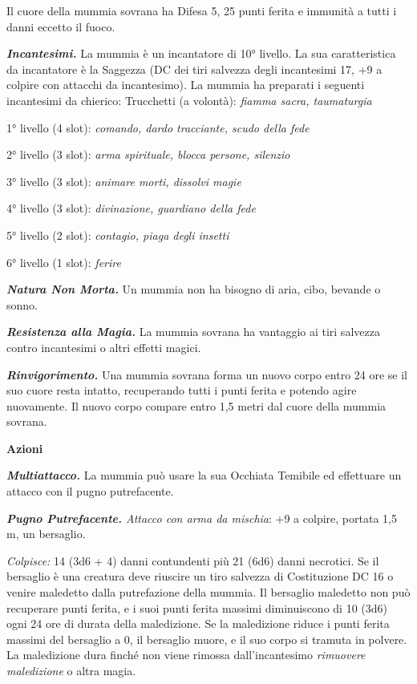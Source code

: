 \begin{multicols}{2}
Il cuore della mummia sovrana ha Difesa 5, 25 punti ferita e immunità a
tutti i danni eccetto il fuoco.

\emph{\textbf{Incantesimi.}} La mummia è un incantatore di 10° livello.
La sua caratteristica da incantatore è la Saggezza (DC dei tiri salvezza
degli incantesimi 17, +9 a colpire con attacchi da incantesimo). La
mummia ha preparati i seguenti incantesimi da chierico: Trucchetti (a
volontà): \emph{fiamma sacra, taumaturgia}

1° livello (4 slot): \emph{comando, dardo tracciante, scudo della fede}

2° livello (3 slot): \emph{arma spirituale, blocca persone, silenzio}

3° livello (3 slot): \emph{animare morti, dissolvi magie}

4° livello (3 slot): \emph{divinazione, guardiano della fede}

5° livello (2 slot): \emph{contagio, piaga degli insetti}

6° livello (1 slot): \emph{ferire}

\emph{\textbf{Natura Non Morta.}} Un mummia non ha bisogno di aria,
cibo, bevande o sonno.

\emph{\textbf{Resistenza alla Magia.}} La mummia sovrana ha vantaggio ai
tiri salvezza contro incantesimi o altri effetti magici.

\emph{\textbf{Rinvigorimento.}} Una mummia sovrana forma un nuovo corpo
entro 24 ore se il suo cuore resta intatto, recuperando tutti i punti
ferita e potendo agire nuovamente. Il nuovo corpo compare entro 1,5
metri dal cuore della mummia sovrana.

\textbf{Azioni}

\emph{\textbf{Multiattacco.}} La mummia può usare la sua Occhiata
Temibile ed effettuare un attacco con il pugno putrefacente.

\emph{\textbf{Pugno Putrefacente.} Attacco con arma da mischia}: +9 a
colpire, portata 1,5 m, un bersaglio.

\emph{Colpisce:} 14 (3d6 + 4) danni contundenti più 21 (6d6) danni
necrotici. Se il bersaglio è una creatura deve riuscire un tiro salvezza
di Costituzione DC 16 o venire maledetto dalla putrefazione della
mummia. Il bersaglio maledetto non può recuperare punti ferita, e i suoi
punti ferita massimi diminuiscono di 10 (3d6) ogni 24 ore di durata
della maledizione. Se la maledizione riduce i punti ferita massimi del
bersaglio a 0, il bersaglio muore, e il suo corpo si tramuta in polvere.
La maledizione dura finché non viene rimossa dall'incantesimo
\emph{rimuovere maledizione} o altra magia.


\end{multicols}

